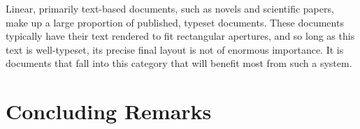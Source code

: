 Linear, primarily text-based documents, such as novels and scientific papers, make up a large proportion of published, typeset documents. These documents typically have their text rendered to fit rectangular apertures, and so long as this text is well-typeset, its precise final layout is not of enormous importance. It is documents that fall into this category that will benefit most from such a system. %


\section{Concluding Remarks}
